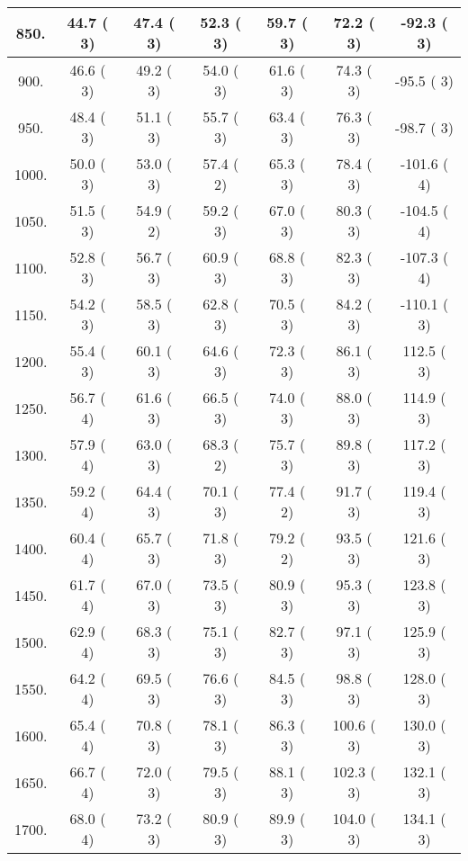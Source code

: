 \begin{tabular}{|c||c|c|c|c|c|c|}
\hline
  850. &    44.7 (      3) &    47.4 (      3) &    52.3 (      3) &    59.7 (      3) &    72.2 (      3) &   -92.3 (      3)\tabularnewline
\hline
  900. &    46.6 (      3) &    49.2 (      3) &    54.0 (      3) &    61.6 (      3) &    74.3 (      3) &   -95.5 (      3)\tabularnewline
\hline
  950. &    48.4 (      3) &    51.1 (      3) &    55.7 (      3) &    63.4 (      3) &    76.3 (      3) &   -98.7 (      3)\tabularnewline
\hline
 1000. &    50.0 (      3) &    53.0 (      3) &    57.4 (      2) &    65.3 (      3) &    78.4 (      3) &  -101.6 (      4)\tabularnewline
\hline
 1050. &    51.5 (      3) &    54.9 (      2) &    59.2 (      3) &    67.0 (      3) &    80.3 (      3) &  -104.5 (      4)\tabularnewline
\hline
 1100. &    52.8 (      3) &    56.7 (      3) &    60.9 (      3) &    68.8 (      3) &    82.3 (      3) &  -107.3 (      4)\tabularnewline
\hline
 1150. &    54.2 (      3) &    58.5 (      3) &    62.8 (      3) &    70.5 (      3) &    84.2 (      3) &  -110.1 (      3)\tabularnewline
\hline
 1200. &    55.4 (      3) &    60.1 (      3) &    64.6 (      3) &    72.3 (      3) &    86.1 (      3) &   112.5 (      3)\tabularnewline
\hline
 1250. &    56.7 (      4) &    61.6 (      3) &    66.5 (      3) &    74.0 (      3) &    88.0 (      3) &   114.9 (      3)\tabularnewline
\hline
 1300. &    57.9 (      4) &    63.0 (      3) &    68.3 (      2) &    75.7 (      3) &    89.8 (      3) &   117.2 (      3)\tabularnewline
\hline
 1350. &    59.2 (      4) &    64.4 (      3) &    70.1 (      3) &    77.4 (      2) &    91.7 (      3) &   119.4 (      3)\tabularnewline
\hline
 1400. &    60.4 (      4) &    65.7 (      3) &    71.8 (      3) &    79.2 (      2) &    93.5 (      3) &   121.6 (      3)\tabularnewline
\hline
 1450. &    61.7 (      4) &    67.0 (      3) &    73.5 (      3) &    80.9 (      3) &    95.3 (      3) &   123.8 (      3)\tabularnewline
\hline
 1500. &    62.9 (      4) &    68.3 (      3) &    75.1 (      3) &    82.7 (      3) &    97.1 (      3) &   125.9 (      3)\tabularnewline
\hline
 1550. &    64.2 (      4) &    69.5 (      3) &    76.6 (      3) &    84.5 (      3) &    98.8 (      3) &   128.0 (      3)\tabularnewline
\hline
 1600. &    65.4 (      4) &    70.8 (      3) &    78.1 (      3) &    86.3 (      3) &   100.6 (      3) &   130.0 (      3)\tabularnewline
\hline
 1650. &    66.7 (      4) &    72.0 (      3) &    79.5 (      3) &    88.1 (      3) &   102.3 (      3) &   132.1 (      3)\tabularnewline
\hline
 1700. &    68.0 (      4) &    73.2 (      3) &    80.9 (      3) &    89.9 (      3) &   104.0 (      3) &   134.1 (      3)\tabularnewline

\end{tabular}
